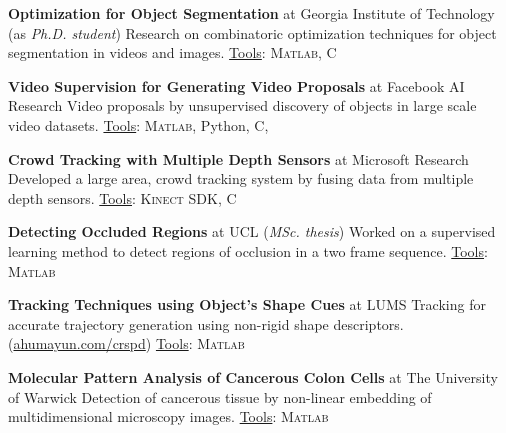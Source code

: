 \documentclass[10pt,twoside,a4paper]{article}
\newif\ifdetail
\newcommand\CPP{C\nolinebreak[4]\hspace{-.05em}\raisebox{.4ex}{\relsize{-3}{\textbf{++}}}}
\begin{document}
\textbf{Optimization for Object Segmentation} at Georgia Institute of Technology (as \textit{Ph.D. student}) \newline
Research on combinatoric optimization techniques for object segmentation in videos and images. \underline{Tools}: \textsc{Matlab}, \CPP

\textbf{Video Supervision for Generating Video Proposals} at Facebook AI Research \newline
\ifdetail Research on generating video \else Video \fi proposals by unsupervised discovery of objects in large scale video datasets. \underline{Tools}: \textsc{Matlab}, Python, \CPP, \ifdetail Javascript, PHP \fi

\ifdetail
\textbf{Object Proposals for CT Images} at Georgia Institute of Technology (as \textit{Ph.D. student}) \newline
Supervising a project for generating segmentation proposals in 3D CT scans, leading to detection of organs.
\fi

\textbf{Crowd Tracking with Multiple Depth Sensors} at Microsoft Research \newline
Developed a large area, crowd tracking system by fusing data from multiple depth sensors. \underline{Tools}: \textsc{Kinect SDK}, \CPP

\textbf{Detecting Occluded Regions} at UCL (\textit{MSc. thesis})\newline
Worked on a supervised learning method to detect regions of occlusion in a two frame sequence. \underline{Tools}: \textsc{Matlab}

\textbf{Tracking Techniques using Object's Shape Cues} at LUMS \newline
\ifdetail Researched tracking techniques for accurate generation of trajectories using object's non-rigid shape descriptors, resilient to occlusion. This was partly funded by NSF. \else Tracking for accurate trajectory generation using non-rigid shape descriptors. \fi (\href{http://ahumayun.com/crspd.html}{ahumayun.com/crspd}) \underline{Tools}: \textsc{Matlab}

\textbf{Molecular Pattern Analysis of Cancerous Colon Cells} at The University of Warwick \newline
\ifdetail A multi-disciplinary project for the detection of cancerous tissue. We developed registration and non-linear embedding techniques for analysis of tissues from a multidimensional imaging process. \else Detection of cancerous tissue by non-linear embedding of multidimensional microscopy images. \fi \underline{Tools}: \textsc{Matlab}
\end{document}
